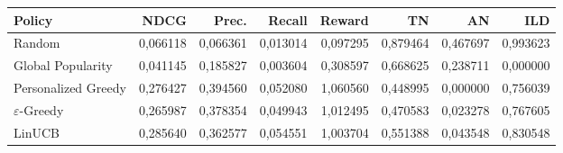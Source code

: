 \begin{tabular}{lrrrrrrr}
\toprule
Policy & NDCG & Prec. & Recall & Reward & TN & AN & ILD \\
\midrule
Random & 0,066118 & 0,066361 & 0,013014 & 0,097295 & 0,879464 & 0,467697 & 0,993623 \\
Global Popularity & 0,041145 & 0,185827 & 0,003604 & 0,308597 & 0,668625 & 0,238711 & 0,000000 \\
Personalized Greedy & 0,276427 & 0,394560 & 0,052080 & 1,060560 & 0,448995 & 0,000000 & 0,756039 \\
$\varepsilon$-Greedy & 0,265987 & 0,378354 & 0,049943 & 1,012495 & 0,470583 & 0,023278 & 0,767605 \\
LinUCB & 0,285640 & 0,362577 & 0,054551 & 1,003704 & 0,551388 & 0,043548 & 0,830548 \\
\bottomrule
\end{tabular}
